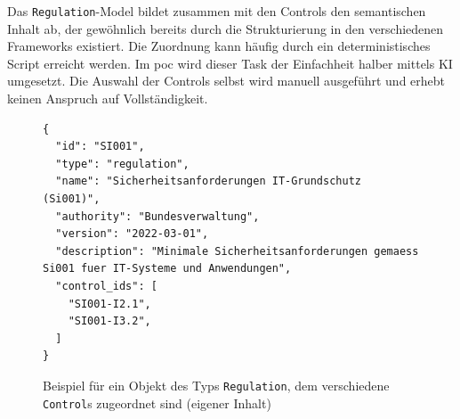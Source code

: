 






Das \texttt{Regulation}-Model bildet zusammen mit den Controls den semantischen Inhalt ab, der gewöhnlich bereits durch die Strukturierung in den verschiedenen Frameworks existiert. Die Zuordnung kann häufig durch ein deterministisches Script erreicht werden. Im \ac{poc} wird dieser Task der Einfachheit halber mittels KI umgesetzt. Die Auswahl der Controls selbst wird manuell ausgeführt und erhebt keinen Anspruch auf Vollständigkeit.

\begin{figure}[H]
\centering
\begin{lstlisting}
{
  "id": "SI001",
  "type": "regulation",
  "name": "Sicherheitsanforderungen IT-Grundschutz (Si001)",
  "authority": "Bundesverwaltung",
  "version": "2022-03-01",
  "description": "Minimale Sicherheitsanforderungen gemaess Si001 fuer IT-Systeme und Anwendungen",
  "control_ids": [
    "SI001-I2.1",
    "SI001-I3.2",
  ]
}
\end{lstlisting}
\caption{Beispiel für ein Objekt des Typs \texttt{Regulation}, dem verschiedene \texttt{Control}s zugeordnet sind (eigener Inhalt)}
\label{fig:regulation-sample}
\end{figure}

